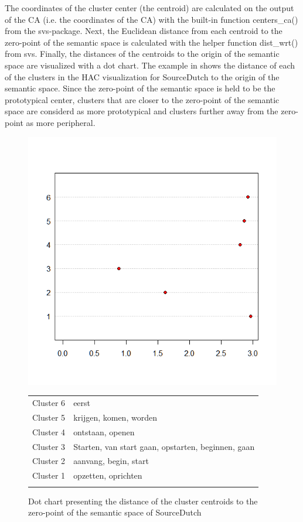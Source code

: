The coordinates of the cluster center (the centroid) are calculated on the output of the CA (i.e. the coordinates of the CA) with the built-in function centers\_ca() from the svs{}-package. Next, the Euclidean distance from each centroid to the zero-point of the semantic space is calculated with the helper function dist\_wrt() from svs. Finally, the distances of the centroids to the origin of the semantic space are visualized with a dot chart. The example in  shows the distance of each of the clusters in the HAC visualization for SourceDutch to the origin of the semantic space. Since the zero-point of the semantic space is held to be the prototypical center, clusters that are closer to the zero-point of the semantic space are considerd as more prototypical and clusters further away from the zero-point as more peripheral. 

\begin{figure}
\includegraphics[height=.4\textheight]{figures/Vandevoorde2-img48.png}
\scriptsize
\begin{tabular}{ll}
\lsptoprule
Cluster 6 & eerst\\
Cluster 5 & krijgen, komen, worden\\
Cluster 4 & ontstaan, openen\\
Cluster 3 & Starten, van start gaan, opstarten, beginnen, gaan\\
Cluster 2 & aanvang, begin, start\\
Cluster 1 & opzetten, oprichten\\
\lspbottomrule
\end{tabular}
\normalsize
\caption{\label{fig:3:48}  Dot chart presenting the distance of the cluster centroids to the zero-point of the semantic space of SourceDutch}
\end{figure}

